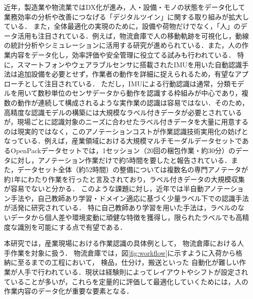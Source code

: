 \documentclass[submit]{ipsj}
\begin{document}
{近年，製造業や物流業ではDX化が進み，人・設備・モノの状態をデータ化して業務効率の分析や改善につなげる「デジタルツイン」に関する取り組みが拡大している\cite{kaiblinger2022state, leng2019digital}．
また，全体最適化の実現のために，設備や荷物だけでなく，「人」のデータ活用も注目されている．例えば，物流倉庫で人の移動軌跡を可視化し，動線の統計分析やシミュレーションに活用する研究が進められている\cite{mori2025wideangle,11213222,kawaguchi2025digitization}．また，人の作業内容をデータ化し，効率評価や安全管理に役立てる試みも行われている\cite{niemann2021context}．
特に，スマートフォンやウェアラブルセンサに搭載されたIMUを用いた自動認識手法は追加設備を必要とせず，作業者の動作を詳細に捉えられるため，有望なアプローチとして注目されている\cite{straczkiewicz2021systematic}．
ただし，IMUによる行動認識は通常，分類モデルを用いて数秒単位のセンサデータから動作を認識する枠組みが中心であり，複数の動作が連続して構成されるような実作業の認識は容易ではない．そのため，高精度な認識モデルの構築には大規模なラベル付きデータが必要とされているが，現場ごとに認識対象のニーズに合わせたラベル付きデータを大量に用意するのは現実的ではなく，このアノテーションコストが作業認識技術実用化の妨げとなっている．例えば，産業領域における大規模マルチモーダルデータセットであるOpenPackデータセット\cite{yoshimura2024openpack}では，1セッション（20回の梱包作業・約30分）のデータに対し，アノテーション作業だけで約5時間を要したと報告されている．また，データセット全体（約52時間）の整備については複数名の専門アノテータが約1年にわたり作業を行ったと言及されており，ラベル付きデータの大規模収集が容易でないと分かる．
このような課題に対し，近年では半自動アノテーション手法\cite{higashiura2024semi}や，自己教師あり学習・ドメイン適応に基づく少量ラベル下での認識手法\cite{chakma2023domain,yuan2024self}が活発に研究されている．
特に自己教師あり学習を用いた手法は，ラベルのないデータから個人差や環境変動に頑健な特徴を獲得し，限られたラベルでも高精度な識別を可能にする点で有望である．

本研究では，産業現場における作業認識の具体例として，
物流倉庫における人手作業を対象に扱う．
物流倉庫では，図\ref{fig:workflow}に示すように入荷から格納に至るまでの工程において，
検品，仕分け，搬送といった
自動化が難しい作業が人手で行われている．現状は経験則によってレイアウトやシフトが設定されていることが多いが，これらを定量的に評価して最適化していくためには，人の作業内容のデータ化が重要な要素となる．

}
\end{document}
